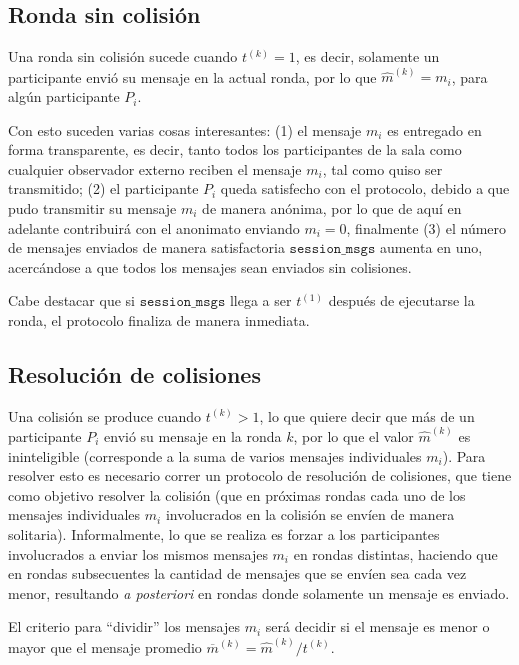 \subsection{Ronda sin colisión}

Una ronda sin colisión sucede cuando $t^{(k)} = 1$, es decir, solamente un participante envió su mensaje en la actual ronda, por lo que $\hat{m}^{(k)} = m_i$, para algún participante $P_i$.

Con esto suceden varias cosas interesantes: (1) el mensaje $m_i$ es entregado en forma transparente, es decir, tanto todos los participantes de la sala como cualquier observador externo reciben el mensaje $m_i$, tal como quiso ser transmitido; (2) el participante $P_i$ queda satisfecho con el protocolo, debido a que pudo transmitir su mensaje $m_i$ de manera anónima, por lo que de aquí en adelante contribuirá con el anonimato enviando $m_i = 0$, finalmente (3) el número de mensajes enviados de manera satisfactoria $\mathtt{session\_msgs}$ aumenta en uno, acercándose a que todos los mensajes sean enviados sin colisiones.

Cabe destacar que si $\mathtt{session\_msgs}$ llega a ser $t^{(1)}$ después de ejecutarse la ronda, el protocolo finaliza de manera inmediata.

\subsection{Resolución de colisiones}

Una colisión se produce cuando $t^{(k)} > 1$, lo que quiere decir que más de un participante $P_i$ envió su mensaje en la ronda $k$, por lo que el valor $\hat{m}^{(k)}$ es ininteligible (corresponde a la suma de varios mensajes individuales $m_i$). Para resolver esto es necesario correr un protocolo de resolución de colisiones, que tiene como objetivo resolver la colisión (que en próximas rondas cada uno de los mensajes individuales $m_i$ involucrados en la colisión se envíen de manera solitaria). Informalmente, lo que se realiza es forzar a los participantes involucrados a enviar los mismos mensajes $m_i$ en rondas distintas, haciendo que en rondas subsecuentes la cantidad de mensajes que se envíen sea cada vez menor, resultando \emph{a posteriori} en rondas donde solamente un mensaje es enviado.

El criterio para ``dividir'' los mensajes $m_i$ será decidir si el mensaje es menor o mayor que el mensaje promedio $\overline{m}^{(k)} = \hat{m}^{(k)} / t^{(k)}$.

